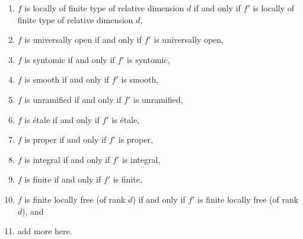 \begin{lemma}
\begin{enumerate}
\item
\label{item-relative-dimension-d}
$f$ is locally of finite type of relative dimension $d$ if and only if
$f'$ is locally of finite type of relative dimension $d$,
\item $f$ is universally open if and only if $f'$ is universally open,
\label{item-universally-open}
\item $f$ is syntomic if and only if $f'$ is syntomic,
\label{item-syntomic}
\item $f$ is smooth if and only if $f'$ is smooth,
\label{item-smooth}
\item $f$ is unramified if and only if $f'$ is unramified,
\label{item-unramified}
\item $f$ is \'etale if and only if $f'$ is \'etale,
\label{item-etale}
\item $f$ is proper if and only if $f'$ is proper,
\label{item-proper}
\item $f$ is integral if and only if $f'$ is integral,
\label{item-integral}
\item $f$ is finite if and only if $f'$ is finite,
\label{item-finite}
\item
\label{item-finite-locally-free}
$f$ is finite locally free (of rank $d$) if and only if $f'$
is finite locally free (of rank $d$), and
\item add more here.
\end{enumerate}
\end{lemma}


